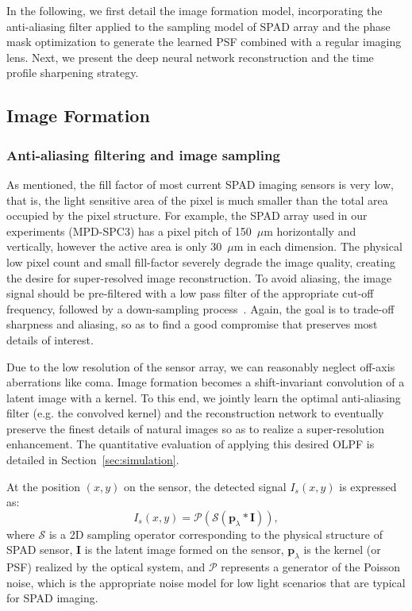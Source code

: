 In the following, we first detail the image formation model,
incorporating the anti-aliasing filter applied to the sampling model
of SPAD array and the phase mask optimization to generate the learned
PSF combined with a regular imaging lens. Next, we present the deep neural
network reconstruction and the time profile sharpening strategy.


\subsection{Image Formation}

\subsubsection{Anti-aliasing filtering and image sampling}
\label{sec:SamplingModel}
As mentioned, the fill factor of most current SPAD imaging sensors is
very low, that is, the light sensitive area of the pixel is much
smaller than the total area occupied by the pixel structure.  For
example, the SPAD array used in our experiments (MPD-SPC3) has a pixel
pitch of 150~$\mu$m horizontally and vertically, however the active
area is only 30~$\mu$m in each dimension. The physical low pixel count
and small fill-factor severely degrade the image quality, creating the
desire for super-resolved image reconstruction. To avoid aliasing, the
image signal should be pre-filtered with a low pass filter of the
appropriate cut-off frequency, followed by a down-sampling
process~\cite{Parker:2017:DSP:3152597}. Again, the goal is to
trade-off sharpness and aliasing, so as to find a good compromise that
preserves most details of interest.

Due to the low resolution of the sensor array, we can
 reasonably neglect off-axis aberrations like coma.
Image formation becomes a shift-invariant convolution of a latent
image with a kernel. To this end, we jointly learn the optimal
anti-aliasing filter (e.g. the convolved kernel) and the
reconstruction network to eventually preserve the finest details of
natural images so as to realize a super-resolution enhancement.  The
quantitative evaluation of applying this desired OLPF is detailed in
Section~\ref{sec:simulation}.

At the position $(x,y)$ on the sensor, the detected signal $I_s(x,y)$
is expressed as:
\begin{equation}\label{eq:imagingModel}
I_s(x,y)=\mathcal{P}  ( \mathcal{S}  ( \bm{p}_{\lambda}*\bm{I} ) ),
\end{equation}
where $\mathcal{S}$ is a 2D sampling operator corresponding to the
physical structure of SPAD sensor, $\bm{I}$ is the latent image formed
on the sensor, $\bm{p}_{\lambda}$ is the kernel (or PSF) realized by
the optical system, and $\mathcal{P}$ represents a generator of the
Poisson noise, which is the appropriate noise model for low light
scenarios that are typical for SPAD imaging.


